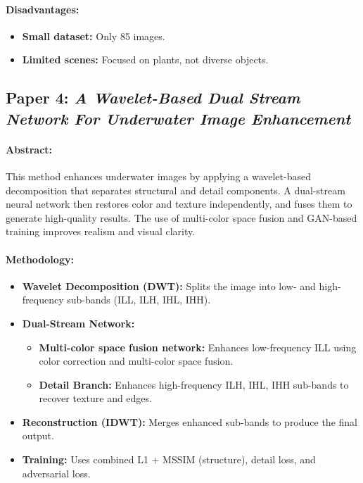 \documentclass{article}
\begin{document}
\paragraph{Disadvantages:}
\begin{itemize}
    \item \textbf{Small dataset:} Only 85 images.
    \item \textbf{Limited scenes:} Focused on plants, not diverse objects.
\end{itemize}

\subsection{Paper 4: \textit{A Wavelet-Based Dual
        Stream Network For Underwater Image Enhancement\cite{Ma_2022}}}

\paragraph{Abstract:}
This method enhances underwater images by applying a wavelet-based decomposition that separates structural and detail components. A dual-stream neural network then restores color and texture independently, and fuses them to generate high-quality results. The use of multi-color space fusion and GAN-based training improves realism and visual clarity.

\paragraph{Methodology:}
\begin{itemize}
    \item  \textbf{Wavelet Decomposition (DWT):} Splits the image into low- and high-frequency sub-bands (ILL, ILH, IHL, IHH).
    \item \textbf{Dual-Stream Network:}
          \begin{itemize}
              \item \textbf{Multi-color space fusion network:}  Enhances low-frequency ILL using color correction and multi-color space fusion.
              \item \textbf{Detail Branch:} Enhances high-frequency ILH, IHL, IHH sub-bands to recover texture and edges.
          \end{itemize}
    \item \textbf{Reconstruction (IDWT):} Merges enhanced sub-bands to produce the final output.
    \item \textbf{Training:} Uses combined L1 + MSSIM (structure), detail loss, and adversarial loss.
\end{itemize}
\end{document}
